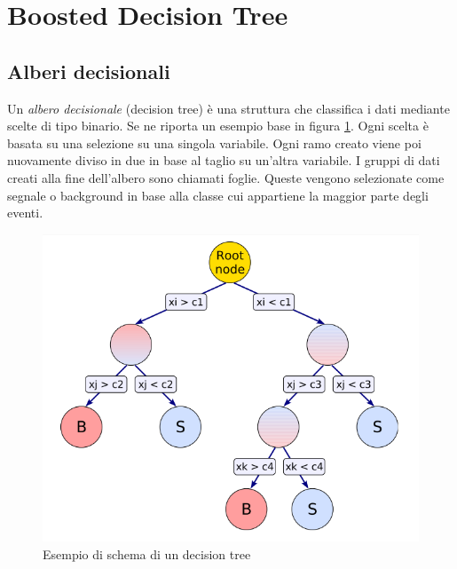 \section{Boosted Decision Tree} \label{BDT}

    \subsection{Alberi decisionali}
    Un \textit{albero decisionale} (decision tree) è una struttura che classifica i dati mediante scelte di tipo binario. Se ne riporta un esempio base in figura \ref{fig:BDT}. Ogni scelta è basata su una selezione su una singola variabile. %
    Ogni ramo creato viene poi nuovamente diviso in due in base al taglio su un'altra variabile. I gruppi di dati creati alla fine dell'albero sono chiamati foglie. Queste vengono selezionate come segnale o background in base alla classe cui appartiene la maggior parte degli eventi. 
    
    \begin{figure}[htbp]
        \centering
        \includegraphics[width=0.5\linewidth]{TMVA/BDT1.PNG}
        \caption{ Esempio di schema di un decision tree}
        \label{fig:BDT}
    \end{figure}
    
